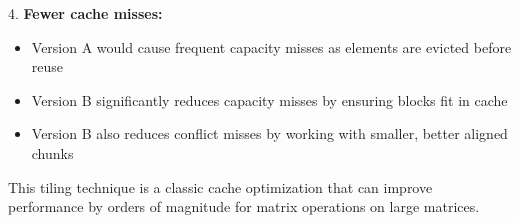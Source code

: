 \begin{example}
4. \textbf{Fewer cache misses:}
   \begin{itemize}
     \item Version A would cause frequent capacity misses as elements are evicted before reuse
     \item Version B significantly reduces capacity misses by ensuring blocks fit in cache
     \item Version B also reduces conflict misses by working with smaller, better aligned chunks
   \end{itemize}

This tiling technique is a classic cache optimization that can improve performance by orders of magnitude for matrix operations on large matrices.
\end{example}
